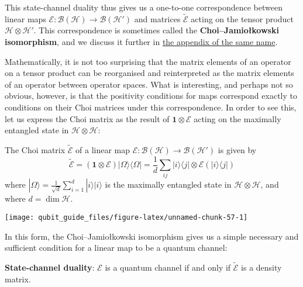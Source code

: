 \documentclass[fleqn]{article}
\newenvironment{idea}{\noindent}{\medskip}
\begin{document}
This state-channel duality thus gives us a one-to-one correspondence between linear maps \(\mathcal{E}\colon\mathcal{B}(\mathcal{H})\to\mathcal{B}(\mathcal{H}')\) and matrices \(\widetilde{\mathcal{E}}\) acting on the tensor product \(\mathcal{H}\otimes\mathcal{H}'\).
This correspondence is sometimes called the \textbf{Choi--Jamiołkowski isomorphism}, and we discuss it further in \protect\hyperlink{choi-jamiolkowski}{the appendix of the same name}.

Mathematically, it is not too surprising that the matrix elements of an operator on a tensor product can be reorganised and reinterpreted as the matrix elements of an operator between operator spaces.
What is interesting, and perhaps not so obvious, however, is that the positivity conditions for maps correspond exactly to conditions on their Choi matrices under this correspondence.
In order to see this, let us express the Choi matrix as the result of \(\mathbf{1}\otimes\mathcal{E}\) acting on the maximally entangled state in \(\mathcal{H}\otimes\mathcal{H}\):

\begin{idea}
The Choi matrix \(\widetilde{\mathcal{E}}\) of a linear map \(\mathcal{E}\colon\mathcal{B}(\mathcal{H})\to\mathcal{B}(\mathcal{H'})\) is given by
\[
  \widetilde{\mathcal{E}}
  = (\mathbf{1}\otimes\mathcal{E})|\Omega\rangle\langle\Omega|
  = \frac{1}{d} \sum_{ij} |i\rangle\langle j|\otimes\mathcal{E}(|i\rangle\langle j|)
\]
where \(|\Omega\rangle=\frac{1}{\sqrt d}\sum_{i=1}^d|i\rangle|i\rangle\) is the maximally entangled state in \(\mathcal{H}\otimes\mathcal{H}\), and where \(d=\dim\mathcal{H}\).

\end{idea}

\begin{center}\texttt{[image: qubit\_guide\_files/figure-latex/unnamed-chunk-57-1]} \end{center}

In this form, the Choi--Jamiołkowski isomorphism gives us a simple necessary and sufficient condition for a linear map to be a quantum channel:

\begin{idea}
\textbf{State-channel duality}: \(\mathcal{E}\) is a quantum channel if and only if \(\widetilde{\mathcal{E}}\) is a density matrix.

\end{idea}
\end{document}
